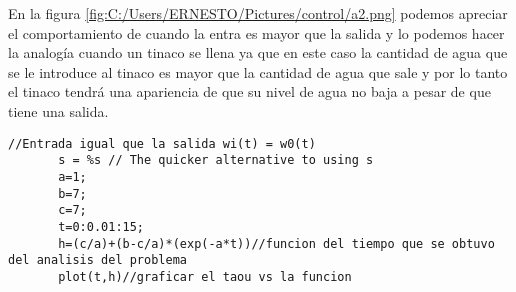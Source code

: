 \documentclass{article}
\begin{document}
En la figura \ref{fig:C:/Users/ERNESTO/Pictures/control/a2.png} podemos apreciar el comportamiento de cuando la entra es mayor que la salida y lo podemos hacer la analogía cuando un tinaco se llena ya que en este caso la cantidad de agua que se le introduce al tinaco es mayor que la cantidad de agua que sale y por lo tanto el tinaco tendrá una apariencia de que su nivel de agua no baja a pesar de que tiene una salida.\\
\begin{lstlisting}[frame=single]
       //Entrada igual que la salida wi(t) = w0(t)
       s = %s // The quicker alternative to using s
       a=1;  
       b=7;
       c=7;
       t=0:0.01:15;
       h=(c/a)+(b-c/a)*(exp(-a*t))//funcion del tiempo que se obtuvo del analisis del problema
       plot(t,h)//graficar el taou vs la funcion
\end{lstlisting}
\end{document}
